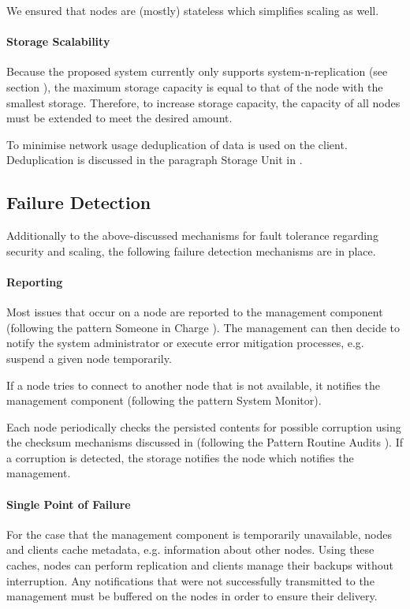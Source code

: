 We ensured that \glspl{node} are (mostly) stateless which simplifies scaling as well.

\paragraph{Storage Scalability} Because the proposed system currently only supports \gls{system-n-replication} (see section ), the maximum storage capacity is equal to that of the \gls{node} with the smallest storage. Therefore, to increase storage capacity, the capacity of all \glspl{node} must be extended to meet the desired amount.

To minimise network usage deduplication of data is used on the \gls{client}. Deduplication is  discussed in the paragraph Storage Unit in  .

\subsection{Failure Detection}

Additionally to the above-discussed mechanisms for fault tolerance regarding security and scaling, the following failure detection mechanisms are in place.

\paragraph{Reporting} Most issues that occur on a \gls{node} are reported to the \gls{management} component (following the pattern Someone in Charge \cite{fault-tolerance}). The \gls{management} can then decide to notify the system administrator or execute error mitigation processes, e.g. suspend a given \gls{node} temporarily.

If a \gls{node} tries to connect to another \gls{node} that is not available, it notifies the \gls{management} component (following the pattern System Monitor\cite{fault-tolerance}).

Each \gls{node} periodically checks the persisted contents for possible corruption using the checksum mechanisms discussed in  (following the Pattern Routine Audits \cite{fault-tolerance}). If a corruption is detected, the \gls{storage} notifies the \gls{node} which notifies the \gls{management}.

\paragraph{Single Point of Failure} For the case that the \gls{management} component is temporarily unavailable, \glspl{node} and \glspl{client} cache metadata, e.g. information about other \glspl{node}. Using these caches, \glspl{node} can perform replication and \glspl{client} manage their backups without interruption. Any notifications that were not successfully transmitted to the \gls{management} must be buffered on the \glspl{node} in order to ensure their delivery.

